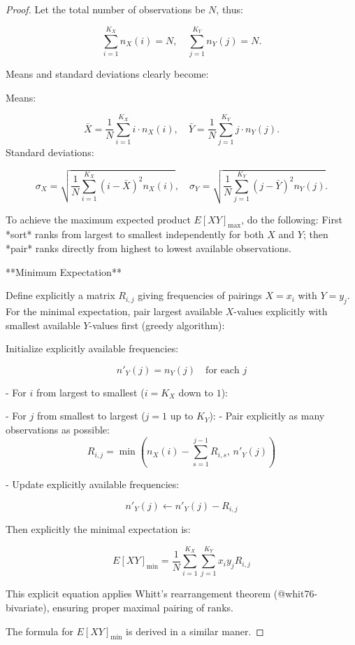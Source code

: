 \documentclass[
  12pt,
]{article}
\begin{document}
\begin{proof}

Let the total number of observations be $N$, thus:

$$\sum_{i=1}^{K_X} n_{X}(i) = N,\quad \sum_{j=1}^{K_Y} n_{Y}(j) = N.$$

Means and standard deviations clearly become:

Means:
    
$$
\bar{X} = \frac{1}{N}\sum_{i=1}^{K_X} i \cdot n_X(i),\quad  
    \bar{Y} = \frac{1}{N}\sum_{j=1}^{K_Y} j \cdot n_Y(j).
$$
Standard deviations:
    
$$
\sigma_X = \sqrt{\frac{1}{N}\sum_{i=1}^{K_X} (i - \bar{X})^2 n_X(i)},\quad  
    \sigma_Y = \sqrt{\frac{1}{N}\sum_{j=1}^{K_Y} (j - \bar{Y})^2 n_Y(j)}.
$$


To achieve the maximum expected product $E[XY]_{\text{max}}$, do the following:
First *sort* ranks from largest to smallest independently for both $X$ and $Y$; then *pair* ranks directly from highest to lowest available observations.
    




**Minimum Expectation**


Define explicitly a matrix $R_{i,j}$ giving frequencies of pairings $X=x_i$ with $Y=y_j$. For the minimal expectation, pair largest available $X$-values explicitly with smallest available $Y$-values first (greedy algorithm):

Initialize explicitly available frequencies:
    

$$n'_Y(j)=n_Y(j)\quad\text{for each }j$$

- For $i$ from largest to smallest ($i=K_X$ down to $1$):
    
    - For $j$ from smallest to largest ($j=1$ up to $K_Y$):
        - Pair explicitly as many observations as possible:
$$R_{i,j}=\min\left(n_X(i)-\sum_{s=1}^{j-1}R_{i,s},\, n'_Y(j)\right)$$

- Update explicitly available frequencies:


$$n'_Y(j)\leftarrow n'_Y(j)-R_{i,j}$$

Then explicitly the minimal expectation is:

$$E[XY]_{\text{min}}=\frac{1}{N}\sum_{i=1}^{K_X}\sum_{j=1}^{K_Y} x_i y_j R_{i,j}$$


This explicit equation applies Whitt’s rearrangement theorem 
(@whit76-bivariate),
ensuring proper maximal pairing of ranks.

The formula for $E[XY]_{\text{min}}$ is derived in a similar maner.

\end{proof}
\end{document}
